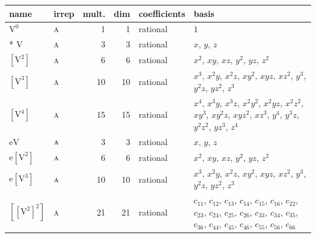 \documentclass[10pt,a4paper]{article}
\numberwithin{equation}{section}
\newcommand{\irr}[1]{\text{\normalfont\scshape #1}}
\newcommand{\jahn}[1]{\mathrm{#1}}
\newlength{\fillwidth}\newlength{\cellwidth}\newlength{\colwidth}
\newcommand{\cellmax}[1]{\settowidth{\cellwidth}{#1}%
  \ifdim\cellwidth>\colwidth\setlength{\colwidth}{\cellwidth}\fi}
\begin{document}
{\small\setlength{\fillwidth}{\textwidth}\addtolength{\fillwidth}{-10\tabcolsep}\setlength{\colwidth}{0pt}\cellmax{$\jahn{[[V^{2}]^{2}]}$}\cellmax{$\jahn{e[V^{2}]V}$}\cellmax{$\jahn{V[V^{2}]}$}\cellmax{$\jahn{V[V^{3}]}$}\cellmax{$\jahn{[V^{2}]^{2}}$}\cellmax{$\jahn{e[V^{2}]}$}\cellmax{$\jahn{e[V^{3}]}$}\cellmax{$\jahn{[V^{2}]}$}\cellmax{$\jahn{[V^{3}]}$}\cellmax{$\jahn{[V^{4}]}$}\cellmax{name}\cellmax{$\jahn{V^{0}}$}\cellmax{$\jahn{eV}$}\cellmax{$\jahn{V}$}\addtolength{\fillwidth}{-\colwidth}\setlength{\colwidth}{0pt}\cellmax{irrep}\cellmax{$\irr{a}$}\addtolength{\fillwidth}{-\colwidth}\setlength{\colwidth}{0pt}\cellmax{mult.}\cellmax{10}\cellmax{15}\cellmax{18}\cellmax{21}\cellmax{30}\cellmax{36}\cellmax{1}\cellmax{3}\cellmax{6}\addtolength{\fillwidth}{-\colwidth}\setlength{\colwidth}{0pt}\cellmax{dim}\cellmax{10}\cellmax{15}\cellmax{18}\cellmax{21}\cellmax{30}\cellmax{36}\cellmax{1}\cellmax{3}\cellmax{6}\addtolength{\fillwidth}{-\colwidth}\setlength{\colwidth}{0pt}\cellmax{coefficients}\cellmax{rational}\addtolength{\fillwidth}{-\colwidth}\begin{longtable}{@{}llrrl>{\RaggedRight\arraybackslash}p{\fillwidth}@{}}\toprule
name & irrep & mult. & dim & coefficients & basis\\\midrule\endhead
\bottomrule\endfoot\endlastfoot
$\jahn{V^{0}}$ & $\irr{a}$ & 1 & 1 & rational & $1$\\*
$\jahn{V}$ & $\irr{a}$ & 3 & 3 & rational & $x$, $y$, $z$\\
$\jahn{[V^{2}]}$ & $\irr{a}$ & 6 & 6 & rational & $x^{2}$, $xy$, $xz$, $y^{2}$, $yz$, $z^{2}$\\
$\jahn{[V^{3}]}$ & $\irr{a}$ & 10 & 10 & rational & $x^{3}$, $x^{2}y$, $x^{2}z$, $xy^{2}$, $xyz$, $xz^{2}$, $y^{3}$, $y^{2}z$, $yz^{2}$, $z^{3}$\\
$\jahn{[V^{4}]}$ & $\irr{a}$ & 15 & 15 & rational & $x^{4}$, $x^{3}y$, $x^{3}z$, $x^{2}y^{2}$, $x^{2}yz$, $x^{2}z^{2}$, $xy^{3}$, $xy^{2}z$, $xyz^{2}$, $xz^{3}$, $y^{4}$, $y^{3}z$, $y^{2}z^{2}$, $yz^{3}$, $z^{4}$\\
$\jahn{eV}$ & $\irr{a}$ & 3 & 3 & rational & $x$, $y$, $z$\\
$\jahn{e[V^{2}]}$ & $\irr{a}$ & 6 & 6 & rational & $x^{2}$, $xy$, $xz$, $y^{2}$, $yz$, $z^{2}$\\
$\jahn{e[V^{3}]}$ & $\irr{a}$ & 10 & 10 & rational & $x^{3}$, $x^{2}y$, $x^{2}z$, $xy^{2}$, $xyz$, $xz^{2}$, $y^{3}$, $y^{2}z$, $yz^{2}$, $z^{3}$\\
$\jahn{[[V^{2}]^{2}]}$ & $\irr{a}$ & 21 & 21 & rational & $c_{11}$, $c_{12}$, $c_{13}$, $c_{14}$, $c_{15}$, $c_{16}$, $c_{22}$, $c_{23}$, $c_{24}$, $c_{25}$, $c_{26}$, $c_{33}$, $c_{34}$, $c_{35}$, $c_{36}$, $c_{44}$, $c_{45}$, $c_{46}$, $c_{55}$, $c_{56}$, $c_{66}$\\

\end{longtable}}
\end{document}
